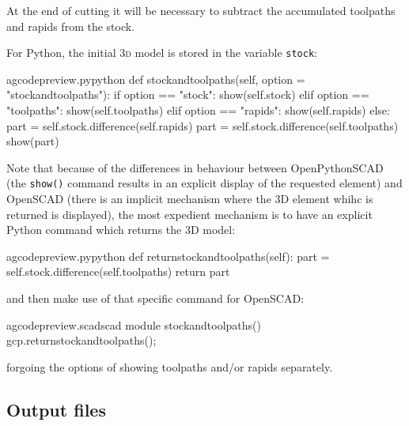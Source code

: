 \documentclass{ltxdoc}
\begin{document}
At the end of cutting it will be necessary to subtract the accumulated toolpaths and rapids from the stock. %

For Python, the initial \textsc{3d} model is stored in the variable \verb|stock|:

\lstset{firstnumber=\thegcpy}
\begin{writecode}{a}{gcodepreview.py}{python}
    def stockandtoolpaths(self, option = "stockandtoolpaths"):
        if option == "stock":
            show(self.stock)
        elif option == "toolpaths":
            show(self.toolpaths)
        elif option == "rapids":
            show(self.rapids)
        else:
            part = self.stock.difference(self.rapids)
            part = self.stock.difference(self.toolpaths)
            show(part)

\end{writecode}
\addtocounter{gcpy}{12}

\noindent Note that because of the differences in behaviour between OpenPythonSCAD (the \verb|show()| command results in an explicit display of the requested element) and OpenSCAD (there is an implicit mechanism where the 3D element whihc is returned is displayed), the most expedient mechanism is to have an explicit Python command which returns the 3D model:

\lstset{firstnumber=\thegcpy}
\begin{writecode}{a}{gcodepreview.py}{python}
    def returnstockandtoolpaths(self):
        part = self.stock.difference(self.toolpaths)
        return part

\end{writecode}
\addtocounter{gcpy}{4}

\noindent and then make use of that specific command for OpenSCAD:

\lstset{firstnumber=\thegcpscad}
\begin{writecode}{a}{gcodepreview.scad}{scad}
module stockandtoolpaths(){
    gcp.returnstockandtoolpaths();
}

\end{writecode}
\addtocounter{gcpscad}{4}

\noindent forgoing the options of showing toolpaths and/or rapids separately.

\subsection{Output files}
\end{document}

